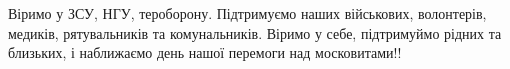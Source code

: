 Віримо у ЗСУ, НГУ, тероборону. Підтримуємо наших військових, волонтерів,
медиків, рятувальників та комунальників. Віримо у себе, підтримуймо рідних та
близьких, і наближаємо день нашої перемоги над московитами!!

